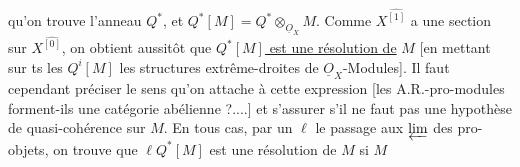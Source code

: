 qu'on trouve l'anneau  $Q^*$, et $Q^*[M]=Q^*\otimes_{\underline O_X}M$. Comme $X^{\widehat{[1]}}$ a une section sur $X^{\widehat{[0]}}$, on obtient aussitôt que \uline{$Q^*[M]$ est une résolution de} $M$ [en mettant sur ts les $Q^i[M]$ les structures extrême-droites de $\underline O_X$-Modules]. Il faut cependant préciser le sens qu'on attache à cette expression [les A.R.-pro-modules forment-ils une catégorie abélienne ?....] et s'assurer s'il ne faut pas une hypothèse de quasi-cohérence sur $M$.
En tous cas,   par un $\ell$ le passage aux $\varprojlim$ des pro-objets, on trouve que $\ell Q^*[M]$ est une résolution de $M$ si $M$ 
